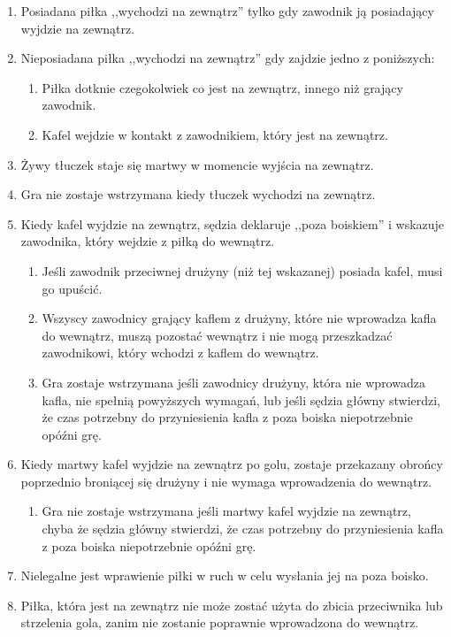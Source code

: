 \documentclass[11pt,a4paper]{article}
\begin{document}
\begin{enumerate}

\item
  Posiadana piłka ,,wychodzi na zewnątrz'' tylko gdy zawodnik ją
  posiadający wyjdzie na zewnątrz.
\item
  Nieposiadana piłka ,,wychodzi na zewnątrz'' gdy zajdzie jedno z
  poniższych:

  \begin{enumerate}
  
  \item
    Piłka dotknie czegokolwiek co jest na zewnątrz, innego niż grający
    zawodnik.
  \item
    Kafel wejdzie w kontakt z zawodnikiem, który jest na zewnątrz.
  \end{enumerate}
\item
  Żywy tłuczek staje się martwy w momencie wyjścia na zewnątrz.
\item
  Gra nie zostaje wstrzymana kiedy tłuczek wychodzi na zewnątrz.
\item
  Kiedy kafel wyjdzie na zewnątrz, sędzia deklaruje ,,poza boiskiem'' i
  wskazuje zawodnika, który wejdzie z piłką do wewnątrz.

  \begin{enumerate}
  
  \item
    Jeśli zawodnik przeciwnej drużyny (niż tej wskazanej) posiada kafel,
    musi go upuścić.
  \item
    Wszyscy zawodnicy grający kaflem z drużyny, które nie wprowadza
    kafla do wewnątrz, muszą pozostać wewnątrz i nie mogą przeszkadzać
    zawodnikowi, który wchodzi z kaflem do wewnątrz.
  \item
    Gra zostaje wstrzymana jeśli zawodnicy drużyny, która nie wprowadza
    kafla, nie spełnią powyższych wymagań, lub jeśli sędzia główny
    stwierdzi, że czas potrzebny do przyniesienia kafla z poza boiska
    niepotrzebnie opóźni grę.
  \end{enumerate}
\item
  Kiedy martwy kafel wyjdzie na zewnątrz po golu, zostaje przekazany
  obrońcy poprzednio broniącej się drużyny i nie wymaga wprowadzenia do
  wewnątrz.

  \begin{enumerate}
  
  \item
    Gra nie zostaje wstrzymana jeśli martwy kafel wyjdzie na zewnątrz,
    chyba że sędzia główny stwierdzi, że czas potrzebny do przyniesienia
    kafla z poza boiska niepotrzebnie opóźni grę.
  \end{enumerate}
\item
  Nielegalne jest wprawienie piłki w ruch w celu wysłania jej na poza
  boisko.
\item
  Piłka, która jest na zewnątrz nie może zostać użyta do zbicia
  przeciwnika lub strzelenia gola, zanim nie zostanie poprawnie
  wprowadzona do wewnątrz.
\end{enumerate}
\end{document}

